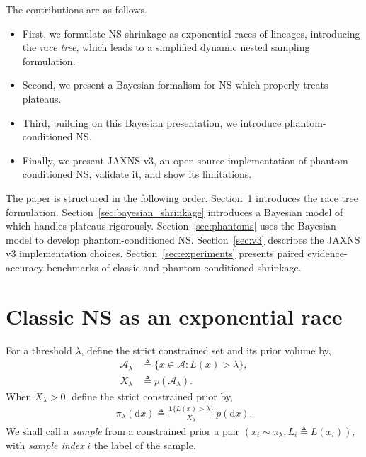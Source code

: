 \documentclass[pdflatex,sn-basic,icol]{sn-jnl}
\newcommand{\dd}{\mathrm{d}}
\newcommand{\ind}{\mathbf{1}}
\theoremstyle{plain}
\theoremstyle{definition}
\begin{document}
The contributions are as follows.
\begin{itemize}
    \item First, we formulate NS shrinkage as exponential races of lineages, introducing the \textit{race tree}, which leads to a simplified dynamic nested sampling formulation.
    \item Second, we present a Bayesian formalism for NS which properly treats plateaus.
    \item Third, building on this Bayesian presentation, we introduce phantom-conditioned NS.
    \item Finally, we present JAXNS v3, an open-source implementation of phantom-conditioned NS, validate it, and show its limitations.
\end{itemize}

The paper is structured in the following order.
Section~\ref{sec:strict_ns} introduces the race tree formulation.
Section~\ref{sec:bayesian_shrinkage} introduces a Bayesian model of which handles plateaus rigorously.
Section~\ref{sec:phantoms} uses the Bayesian model to develop phantom-conditioned NS.
Section~\ref{sec:v3} describes the JAXNS v3 implementation choices.
Section~\ref{sec:experiments} presents paired evidence-accuracy benchmarks of classic and phantom-conditioned shrinkage.

\section{Classic NS as an exponential race}
\label{sec:strict_ns}\label{sec:races}


For a threshold $\lambda$, define the strict constrained set and its prior volume by,
\begin{align}
    \mathcal{A}_\lambda &\triangleq \{x\in\mathcal{A}: L(x)>\lambda\},\\
    X_\lambda &\triangleq p(\mathcal{A}_\lambda).
    \label{eq:X_lambda}
\end{align}
When $X_\lambda>0$, define the strict constrained prior by,
\begin{align}
    \pi_\lambda(\dd x)
    \triangleq
    \frac{\ind\{L(x)>\lambda\}}{X_\lambda}\,p(\dd x).
    \label{eq:strict_constrained_prior}
\end{align}
We shall call a \textit{sample} from a constrained prior a pair $(x_i \sim \pi_\lambda, L_i\triangleq L(x_i))$, with \textit{sample index} $i$ the label of the sample.
\end{document}
